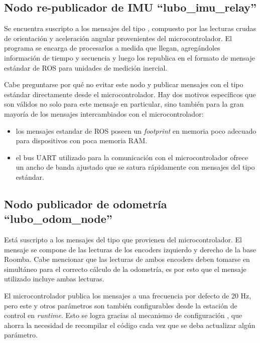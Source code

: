 \subsection{Nodo re-publicador de IMU ``lubo\_imu\_relay''}

Se encuentra suscripto a los mensajes del tipo , compuesto por las lecturas crudas de orientación y aceleración angular provenientes del microcontrolador. El programa se encarga de procesarlos a medida que llegan, agregándoles información de tiempo y secuencia y luego los republica en el formato de mensaje estándar de ROS para unidades de medición inercial\protect\footnotemark.

Cabe preguntarse por qué no evitar este nodo y publicar mensajes con el tipo estándar directamente desde el microcontrolador. Hay dos motivos específicos que son válidos no solo para este mensaje en particular, sino también para la gran mayoría de los mensajes intercambiados con el microcontrolador:
\begin{itemize}
  \item los mensajes estandar de ROS poseen un \textit{footprint} en memoria poco adecuado para dispositivos con poca memoria RAM.
  \item el bus UART utilizado para la comunicación con el microcontrolador ofrece un ancho de banda ajustado que se satura rápidamente con mensajes del tipo estándar.
\end{itemize}


\subsection{Nodo publicador de odometría ``lubo\_odom\_node''}

Está suscripto a los mensajes del tipo  que provienen del microcontrolador. El mensaje se compone de las lecturas de los encoders izquierdo y derecho de la base Roomba. Cabe mencionar que las lecturas de ambos encoders deben tomarse en simultáneo para el correcto cálculo de la odometría, es por esto que el mensaje utilizado incluye ambas lecturas.

El microcontrolador publica los mensajes a una frecuencia por defecto de 20 Hz, pero este y otros parámetros son también configurables desde la estación de control en \textit{runtime}. Esto se logra gracias al mecanismo de configuración , que ahorra la necesidad de recompilar el código cada vez que se deba actualizar algún parámetro.

